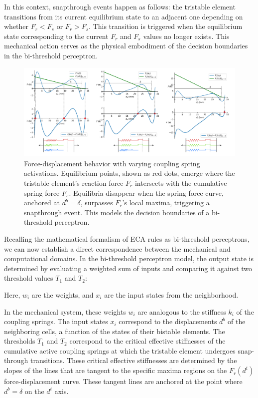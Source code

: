 In this context, snapthrough events happen as follows: the tristable element transitions from its current equilibrium state to an adjacent one depending on whether \( F_r < F_s \) or \( F_r > F_s \). This transition is triggered when the equilibrium state corresponding to the current \( F_r \) and \( F_s \) values no longer exists. This mechanical action serves as the physical embodiment of the decision boundaries in the bi-threshold perceptron.


\begin{figure}[H]
    \centering
    \includegraphics[width=\textwidth]{images/SVGs/Equilibria2.pdf}
    \caption{Force-displacement behavior with varying coupling spring activations. Equilibrium points, shown as red dots, emerge where the tristable element's reaction force \( F_r \) intersects with the cumulative spring force \( F_s \). Equilibria disappear when the spring force curve, anchored at \( d^b = \delta \), surpasses \( F_r \)'s local maxima, triggering a snapthrough event. This models the decision boundaries of a bi-threshold perceptron.}
    \label{fig:Equilibria under actuation}
\end{figure}

Recalling the mathematical formalism of ECA rules as bi-threshold perceptrons, we can now establish a direct correspondence between the mechanical and computational domains. In the bi-threshold perceptron model, the output state is determined by evaluating a weighted sum of inputs and comparing it against two threshold values \( T_1 \) and \( T_2 \):


Here, \( w_i \) are the weights, and \( x_i \) are the input states from the neighborhood.

In the mechanical system, these weights \( w_i \) are analogous to the stiffness \( k_i \) of the coupling springs. The input states \( x_i \) correspond to the displacements \( d^b \) of the neighboring cells, a function of the states of their bistable elements. 
The thresholds \( T_1 \) and \( T_2 \) correspond to the critical effective stiffnesses of the cumulative active coupling springs at which the tristable element undergoes snap-through transitions. These critical effective stiffnesses are determined by the slopes of the lines that are tangent to the specific maxima regions on the \( F_r(d^t) \) force-displacement curve. These tangent lines are anchored at the point where \( d^b = \delta \) on the \( d^t \) axis.

